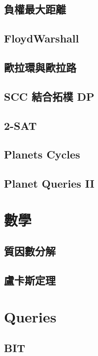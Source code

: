 \subsection{負權最大距離} 

\subsection{FloydWarshall} 

\subsection{歐拉環與歐拉路} 

\subsection{SCC 結合拓樸 DP}

\subsection{2-SAT} 

\subsection{Planets Cycles} 

\subsection{Planet Queries II} 


\section{數學}
\subsection{質因數分解} 

\subsection{盧卡斯定理} 


\section{Queries}
\subsection{BIT} 

